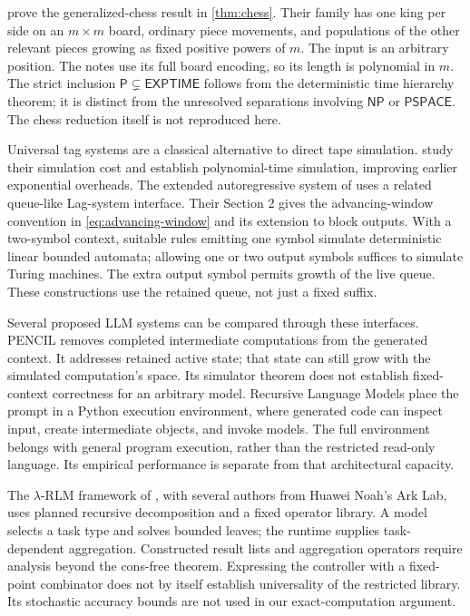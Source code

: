 \documentclass[11pt,twoside]{article}
\theoremstyle{definition}
\theoremstyle{remark}
\begin{document}
 prove the generalized-chess result in \cref{thm:chess}.
Their family has one king per side on an $m\times m$ board, ordinary piece
movements, and populations of the other relevant pieces growing as fixed
positive powers of $m$. The input is an arbitrary position. The notes use
its full board encoding, so its length is polynomial in $m$. The strict
inclusion $\mathsf P\subsetneq\mathsf{EXPTIME}$ follows from the deterministic
time hierarchy theorem; it is distinct from the unresolved separations
involving $\mathsf{NP}$ or $\mathsf{PSPACE}$. The chess reduction itself is
not reproduced here.

Universal tag systems are a classical alternative to direct tape simulation.
\citet{woods2006} study their simulation cost and establish polynomial-time
simulation, improving earlier exponential overheads. The extended
autoregressive system of \citet{schuurmans2024} uses a related queue-like
Lag-system interface. Their Section 2 gives the advancing-window convention
in \eqref{eq:advancing-window} and its extension to block outputs. With a
two-symbol context, suitable rules emitting one symbol simulate deterministic
linear bounded automata; allowing one or two output symbols suffices to simulate
Turing machines. The extra output symbol permits growth of the live queue.
These constructions use the retained queue, not just a fixed suffix.

Several proposed LLM systems can be compared through these interfaces.
PENCIL \citep{pencil2025} removes completed intermediate computations from
the generated context. It addresses retained active state; that state can
still grow with the simulated computation's space. Its simulator theorem
does not establish fixed-context correctness for an arbitrary model.
Recursive Language Models \citep{rlm2025} place the prompt in a Python
execution environment, where generated code can inspect input, create
intermediate objects, and invoke models. The full environment belongs with
general program execution, rather than the restricted read-only language.
Its empirical performance is separate from that architectural capacity.

The $\lambda$-RLM framework of \citet{roy2026}, with several authors from
Huawei Noah's Ark Lab, uses planned recursive decomposition and a fixed
operator library. A model selects a task type and solves bounded leaves;
the runtime supplies task-dependent aggregation. Constructed result lists
and aggregation operators require analysis beyond the cons-free theorem.
Expressing the controller with a fixed-point combinator does not by itself
establish universality of the restricted library. Its stochastic accuracy
bounds are not used in our exact-computation argument.
\end{document}
